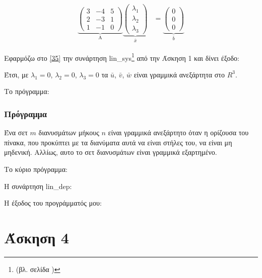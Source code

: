 \documentclass[12pt, fleqn, leqno]{extreport}
\begin{document}
\begin{equation}
    \begin{aligned}%
        \underbrace{
            \begin{pmatrix}
                3 & -4 & 5 \\
                2 & -3 & 1 \\
                1 & -1 & 0
            \end{pmatrix}
        }_\text{A}
        \underbrace{
            \begin{pmatrix}
                \lambda_{1} \\
                \lambda_{2} \\
                \lambda_{3}
            \end{pmatrix}
        }_\text{$\bar{x}$}
         & =
        \underbrace{
            \begin{pmatrix}
                0 \\
                0 \\
                0
            \end{pmatrix}
        }_\text{$\bar{b}$}
    \end{aligned}\label{35}
\end{equation}

Εφαρμόζω στο \eqref{35} την συνάρτηση lin\_sys\footnote{(βλ. σελίδα \pageref{lin_sys})} από την Άσκηση 1 και δίνει έξοδο:

Έτσι, με $\lambda_{1} = 0$, $\lambda_{2} = 0$, $\lambda_{3} = 0$ τα $\bar{u}$, $\bar{v}$, $\bar{w}$ είναι γραμμικά ανεξάρτητα στο $R^{3}$.

Το πρόγραμμα:

\newpage

\subsection{Πρόγραμμα}

Ένα σετ $m$ διανυσμάτων μήκους $n$ είναι γραμμικά ανεξάρτητο όταν η ορίζουσα του πίνακα, που προκύπτει με τα διανύματα αυτά να είναι στήλες του, να είναι μη μηδενική. Αλλίως, αυτο το σετ διανυσμάτων είναι γραμμικά εξαρτημένο.

Το κύριο πρόγραμμα:


Η συνάρτηση lin\_dep:


Η έξοδος του προγράμματός μου:




\chapter{Άσκηση 4}
\end{document}
